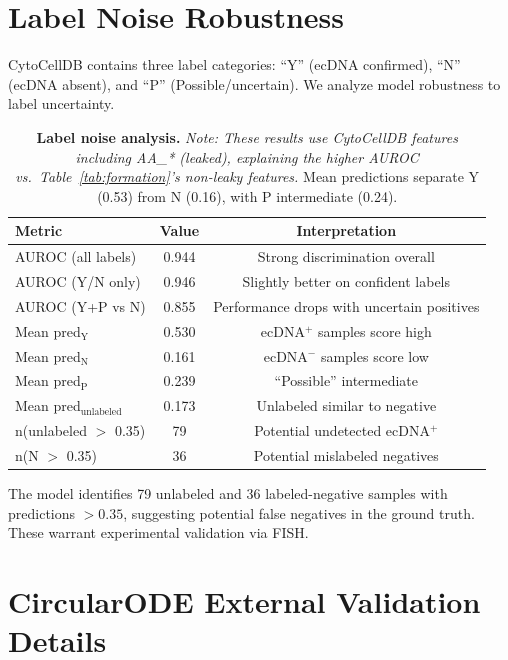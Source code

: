 \documentclass[sigconf,anonymous]{acmart}
\begin{document}
\section{Label Noise Robustness}
\label{app:noise}

CytoCellDB contains three label categories: ``Y'' (ecDNA confirmed), ``N'' (ecDNA absent), and ``P'' (Possible/uncertain). We analyze model robustness to label uncertainty.

\begin{table}[h]
\caption{\textbf{Label noise analysis.} \textit{Note: These results use CytoCellDB features including AA\_* (leaked), explaining the higher AUROC vs.\ Table~\ref{tab:formation}'s non-leaky features.} Mean predictions separate Y (0.53) from N (0.16), with P intermediate (0.24).}
\label{tab:noise}
\centering
\small
\begin{tabular}{@{}lcc@{}}
\toprule
Metric & Value & Interpretation \\
\midrule
AUROC (all labels) & 0.944 & Strong discrimination overall \\
AUROC (Y/N only) & 0.946 & Slightly better on confident labels \\
AUROC (Y+P vs N) & 0.855 & Performance drops with uncertain positives \\
\midrule
Mean pred$_{\text{Y}}$ & 0.530 & ecDNA$^+$ samples score high \\
Mean pred$_{\text{N}}$ & 0.161 & ecDNA$^-$ samples score low \\
Mean pred$_{\text{P}}$ & 0.239 & ``Possible'' intermediate \\
Mean pred$_{\text{unlabeled}}$ & 0.173 & Unlabeled similar to negative \\
\midrule
n(unlabeled $>$ 0.35) & 79 & Potential undetected ecDNA$^+$ \\
n(N $>$ 0.35) & 36 & Potential mislabeled negatives \\
\bottomrule
\end{tabular}
\end{table}

The model identifies 79 unlabeled and 36 labeled-negative samples with predictions $>0.35$, suggesting potential false negatives in the ground truth. These warrant experimental validation via FISH.


\section{CircularODE External Validation Details}
\label{app:circularode_ext}
\end{document}
